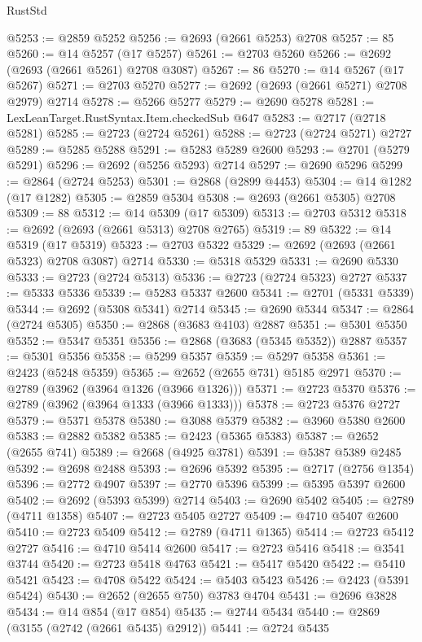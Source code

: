 \begin{lexlean}{RustStd}
\begin{coremodule}
@5253 := @2859 @5252
@5256 := @2693 (@2661 @5253) @2708
@5257 := 85
@5260 := @14 @5257 (@17 @5257)
@5261 := @2703 @5260
@5266 := @2692 (@2693 (@2661 @5261) @2708 @3087)
@5267 := 86
@5270 := @14 @5267 (@17 @5267)
@5271 := @2703 @5270
@5277 := @2692 (@2693 (@2661 @5271) @2708 @2979) @2714
@5278 := @5266 @5277
@5279 := @2690 @5278
@5281 := LexLeanTarget.RustSyntax.Item.checkedSub @647
@5283 := @2717 (@2718 @5281)
@5285 := @2723 (@2724 @5261)
@5288 := @2723 (@2724 @5271) @2727
@5289 := @5285 @5288
@5291 := @5283 @5289 @2600
@5293 := @2701 (@5279 @5291)
@5296 := @2692 (@5256 @5293) @2714
@5297 := @2690 @5296
@5299 := @2864 (@2724 @5253)
@5301 := @2868 (@2899 @4453)
@5304 := @14 @1282 (@17 @1282)
@5305 := @2859 @5304
@5308 := @2693 (@2661 @5305) @2708
@5309 := 88
@5312 := @14 @5309 (@17 @5309)
@5313 := @2703 @5312
@5318 := @2692 (@2693 (@2661 @5313) @2708 @2765)
@5319 := 89
@5322 := @14 @5319 (@17 @5319)
@5323 := @2703 @5322
@5329 := @2692 (@2693 (@2661 @5323) @2708 @3087) @2714
@5330 := @5318 @5329
@5331 := @2690 @5330
@5333 := @2723 (@2724 @5313)
@5336 := @2723 (@2724 @5323) @2727
@5337 := @5333 @5336
@5339 := @5283 @5337 @2600
@5341 := @2701 (@5331 @5339)
@5344 := @2692 (@5308 @5341) @2714
@5345 := @2690 @5344
@5347 := @2864 (@2724 @5305)
@5350 := @2868 (@3683 @4103) @2887
@5351 := @5301 @5350
@5352 := @5347 @5351
@5356 := @2868 (@3683 (@5345 @5352)) @2887
@5357 := @5301 @5356
@5358 := @5299 @5357
@5359 := @5297 @5358
@5361 := @2423 (@5248 @5359)
@5365 := @2652 (@2655 @731) @5185 @2971
@5370 := @2789 (@3962 (@3964 @1326 (@3966 @1326)))
@5371 := @2723 @5370
@5376 := @2789 (@3962 (@3964 @1333 (@3966 @1333)))
@5378 := @2723 @5376 @2727
@5379 := @5371 @5378
@5380 := @3088 @5379
@5382 := @3960 @5380 @2600
@5383 := @2882 @5382
@5385 := @2423 (@5365 @5383)
@5387 := @2652 (@2655 @741)
@5389 := @2668 (@4925 @3781)
@5391 := @5387 @5389 @2485
@5392 := @2698 @2488
@5393 := @2696 @5392
@5395 := @2717 (@2756 @1354)
@5396 := @2772 @4907
@5397 := @2770 @5396
@5399 := @5395 @5397 @2600
@5402 := @2692 (@5393 @5399) @2714
@5403 := @2690 @5402
@5405 := @2789 (@4711 @1358)
@5407 := @2723 @5405 @2727
@5409 := @4710 @5407 @2600
@5410 := @2723 @5409
@5412 := @2789 (@4711 @1365)
@5414 := @2723 @5412 @2727
@5416 := @4710 @5414 @2600
@5417 := @2723 @5416
@5418 := @3541 @3744
@5420 := @2723 @5418 @4763
@5421 := @5417 @5420
@5422 := @5410 @5421
@5423 := @4708 @5422
@5424 := @5403 @5423
@5426 := @2423 (@5391 @5424)
@5430 := @2652 (@2655 @750) @3783 @4704
@5431 := @2696 @3828
@5434 := @14 @854 (@17 @854)
@5435 := @2744 @5434
@5440 := @2869 (@3155 (@2742 (@2661 @5435) @2912))
@5441 := @2724 @5435

\end{coremodule}
\end{lexlean}
